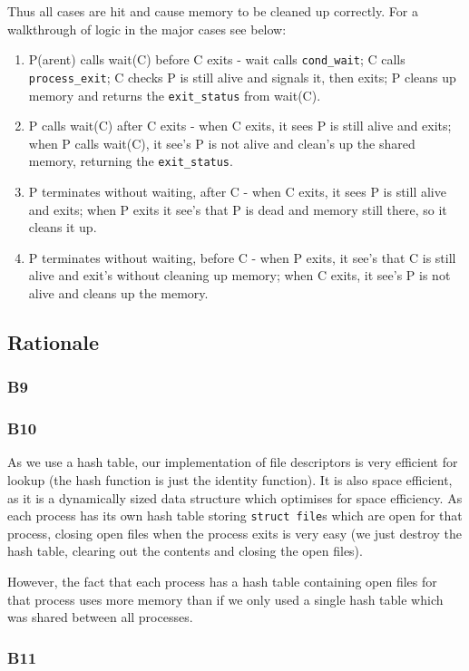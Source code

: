 \documentclass[a4wide, 11pt]{article}
\newcommand{\tx}{\texttt}
\begin{document}
Thus all cases are hit and cause memory to be cleaned up correctly. For a walkthrough of logic in the major cases see below:

\begin{enumerate}
\item P(arent) calls wait(C) before C exits - wait calls \texttt{cond\_wait}; C calls \texttt{process\_exit}; C checks P is still alive and signals it, then exits; P cleans up memory and returns the \texttt{exit\_status} from wait(C).
\item P calls wait(C) after C exits - when C exits, it sees P is still alive and exits; when P calls wait(C), it see's P is not alive and clean's up the shared memory, returning the \texttt{exit\_status}.
\item P terminates without waiting, after C - when C exits, it sees P is still alive and exits; when P exits it see's that P is dead and memory still there, so it cleans it up.
\item P terminates without waiting, before C - when P exits, it see's that C is still alive and exit's without cleaning up memory; when C exits, it see's P is not alive and cleans up the memory.
\end{enumerate}


\subsection{Rationale}
\subsubsection{B9}

\subsubsection{B10}

As we use a hash table, our implementation of file descriptors is very efficient for lookup (the hash function is just the identity function). It is also space efficient, as it is a dynamically sized data structure which optimises for space efficiency. As each process has its own hash table storing \tx{struct file}s which are open for that process, closing open files when the process exits is very easy (we just destroy the hash table, clearing out the contents and closing the open files).

However, the fact that each process has a hash table containing open files for that process uses more memory than if we only used a single hash table which was shared between all processes.

\subsubsection{B11}
\end{document}
